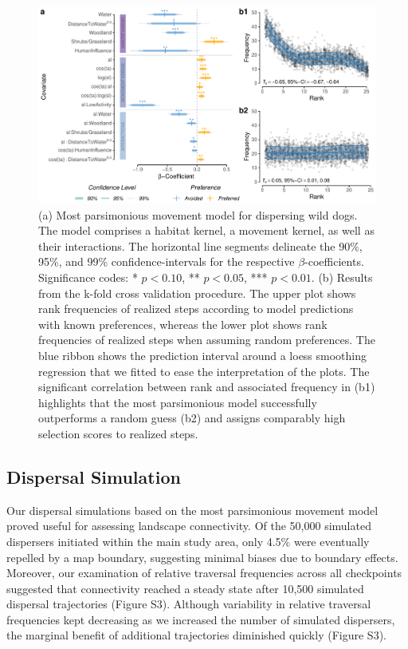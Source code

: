 \documentclass[abstract=on,10pt,a4paper,bibliography=totocnumbered]{article}
\begin{document}
\begin{figure}
  \begin{center}
    \includegraphics[width=\textwidth]{99_MovementModel}
    \caption{(a) Most parsimonious movement model for dispersing wild dogs. The
    model comprises a habitat kernel, a movement kernel, as well as their
    interactions. The horizontal line segments delineate the 90\%, 95\%, and
    99\% confidence-intervals for the respective \(\beta\)-coefficients.
    Significance codes: * \(p < 0.10\), ** \(p < 0.05\), *** \(p < 0.01\). (b)
    Results from the k-fold cross validation procedure. The upper plot shows
    rank frequencies of realized steps according to model predictions with known
    preferences, whereas the lower plot shows rank frequencies of realized steps
    when assuming random preferences. The blue ribbon shows the prediction
    interval around a loess smoothing regression that we fitted to ease the
    interpretation of the plots. The significant correlation between rank and
    associated frequency in (b1) highlights that the most parsimonious model
    successfully outperforms a random guess (b2) and assigns comparably high
    selection scores to realized steps.}
    \label{MovementModel}
  \end{center}
\end{figure}

\subsection{Dispersal Simulation}
Our dispersal simulations based on the most parsimonious movement model proved
useful for assessing landscape connectivity. Of the 50,000 simulated dispersers
initiated within the main study area, only 4.5\% were eventually repelled by a
map boundary, suggesting minimal biases due to boundary effects. Moreover, our
examination of relative traversal frequencies across all checkpoints suggested
that connectivity reached a steady state after 10,500 simulated dispersal
trajectories (Figure S3). Although variability in relative traversal frequencies
kept decreasing as we increased the number of simulated dispersers, the marginal
benefit of additional trajectories diminished quickly (Figure S3).
\end{document}
